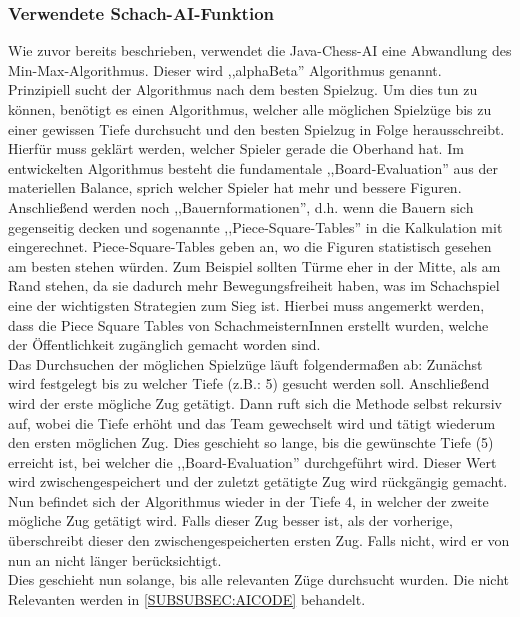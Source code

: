 \documentclass[12pt,a4paper]{article}
\begin{document}
\subsubsection{Verwendete Schach-AI-Funktion}
\label{SUBSUBSEC:OurAI}

Wie zuvor bereits beschrieben, verwendet die Java-Chess-AI eine Abwandlung des Min-Max-Algorithmus. Dieser wird ,,alphaBeta'' Algorithmus genannt. \\
Prinzipiell sucht der Algorithmus nach dem besten Spielzug. Um dies tun zu können, benötigt es einen Algorithmus, welcher alle möglichen Spielzüge bis zu einer gewissen Tiefe durchsucht und den besten Spielzug in Folge herausschreibt. \\ 
Hierfür muss geklärt werden, welcher Spieler gerade die Oberhand hat. Im entwickelten Algorithmus besteht die fundamentale ,,Board-Evaluation'' aus der materiellen Balance, sprich welcher Spieler hat mehr und bessere Figuren. Anschließend werden noch  ,,Bauernformationen'', d.h. wenn die Bauern sich gegenseitig decken und sogenannte ,,Piece-Square-Tables'' in die Kalkulation mit eingerechnet. Piece-Square-Tables geben an, wo die Figuren statistisch gesehen am besten stehen würden. Zum Beispiel sollten Türme eher in der Mitte, als am Rand stehen, da sie dadurch mehr Bewegungsfreiheit haben, was im Schachspiel eine der wichtigsten Strategien zum Sieg ist. Hierbei muss angemerkt werden, dass die Piece Square Tables von SchachmeisternInnen erstellt wurden, welche der Öffentlichkeit zugänglich gemacht worden sind.\cite{SquareTables} \\[2ex]
Das Durchsuchen der möglichen Spielzüge läuft folgendermaßen ab: Zunächst wird festgelegt bis zu welcher Tiefe (z.B.: 5) gesucht werden soll. Anschließend wird der erste mögliche Zug getätigt. Dann ruft sich die Methode selbst rekursiv auf, wobei die Tiefe erhöht und das Team gewechselt wird und tätigt wiederum den ersten möglichen Zug. Dies geschieht so lange, bis die gewünschte Tiefe (5) erreicht ist, bei welcher die ,,Board-Evaluation'' durchgeführt wird. Dieser Wert wird zwischengespeichert und der zuletzt getätigte Zug wird rückgängig gemacht. \\
Nun befindet sich der Algorithmus wieder in der Tiefe 4, in welcher der zweite mögliche Zug getätigt wird. Falls dieser Zug besser ist, als der vorherige, überschreibt dieser den zwischengespeicherten ersten Zug. Falls nicht, wird er von nun an nicht länger berücksichtigt. \\
Dies geschieht nun solange, bis alle relevanten Züge durchsucht wurden. Die nicht Relevanten werden in \ref{SUBSUBSEC:AICODE} behandelt. \\
\end{document}
